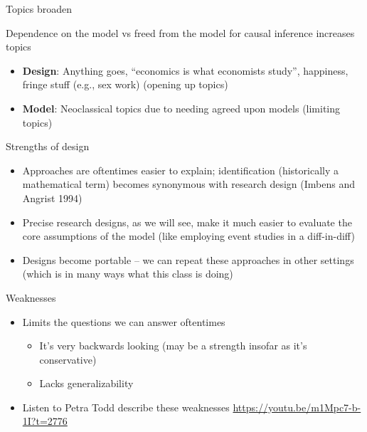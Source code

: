 \documentclass{beamer}
\begin{document}
\begin{frame}{Topics broaden}

  Dependence on the model vs freed from the model for causal inference increases topics
  \begin{itemize}
    \item \textbf{Design}: Anything goes, ``economics is what economists study'', happiness, fringe stuff (e.g., sex work) (opening up topics)
    \item \textbf{Model}: Neoclassical topics due to needing agreed upon models (limiting topics)
  \end{itemize}

\end{frame}

\begin{frame}{Strengths of design}

\begin{itemize}
\item Approaches are oftentimes easier to explain; identification (historically a mathematical term) becomes synonymous with research design (Imbens and Angrist 1994)
\item Precise research designs, as we will see, make it much easier to evaluate the core assumptions of the model (like employing event studies in a diff-in-diff)
\item Designs become portable -- we can repeat these approaches in other settings (which is in many ways what this class is doing)
\end{itemize}

\end{frame}

\begin{frame}{Weaknesses}

\begin{itemize}
\item Limits the questions we can answer oftentimes 
	\begin{itemize}
	\item It's very backwards looking (may be a strength insofar as it's conservative)
	\item Lacks generalizability
	\end{itemize}
\item Listen to Petra Todd describe these weaknesses \url{https://youtu.be/m1Mpc7-b-1I?t=2776}

\end{itemize}

\end{frame}
\end{document}

